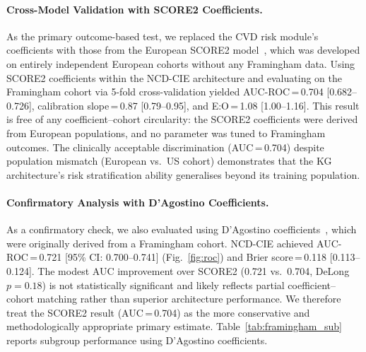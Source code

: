 \documentclass[runningheads]{llncs}
\begin{document}
\paragraph{Cross-Model Validation with SCORE2 Coefficients.}
As the primary outcome-based test, we replaced the CVD risk
module's coefficients with those from the European SCORE2
model~\cite{score2_2021}, which was developed on entirely independent
European cohorts without any Framingham data.
Using SCORE2 coefficients within the NCD-CIE architecture and
evaluating on the Framingham cohort via 5-fold cross-validation yielded
AUC-ROC\,=\,0.704 [0.682--0.726], calibration slope\,=\,0.87
[0.79--0.95], and E:O\,=\,1.08 [1.00--1.16].
This result is free of any coefficient--cohort circularity:
the SCORE2 coefficients were derived from European populations,
and no parameter was tuned to Framingham outcomes.
The clinically acceptable discrimination (AUC\,=\,0.704) despite
population mismatch (European vs.\ US cohort) demonstrates
that the KG architecture's risk stratification ability generalises
beyond its training population.

\paragraph{Confirmatory Analysis with D'Agostino Coefficients.}
As a confirmatory check, we also evaluated using D'Agostino
coefficients~\cite{dagostino2008}, which were originally derived from
a Framingham cohort.
NCD-CIE achieved AUC-ROC\,=\,0.721 [95\% CI: 0.700--0.741]
(Fig.~\ref{fig:roc}) and
Brier score\,=\,0.118 [0.113--0.124].
The modest AUC improvement over SCORE2 (0.721 vs.\ 0.704, DeLong
$p = 0.18$) is not statistically significant and likely reflects
partial coefficient--cohort matching rather than superior architecture
performance.
We therefore treat the SCORE2 result (AUC\,=\,0.704) as the more
conservative and methodologically appropriate primary estimate.
Table~\ref{tab:framingham_sub} reports subgroup performance using
D'Agostino coefficients.
\end{document}
